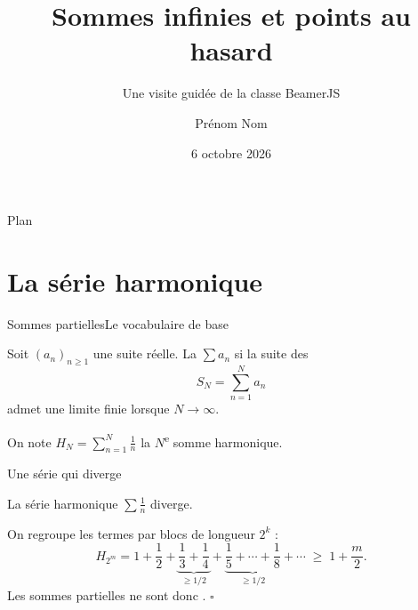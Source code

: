 \documentclass[nuit,charter,pied]{BeamerJS}
\title[Sommes infinies et points au hasard]{Sommes infinies et points au hasard}
\subtitle{Une visite guidée de la classe BeamerJS}
\author{Prénom Nom}
\institute{Université}
\date{6 octobre 2026}
\begin{document}
\begin{frame}
	\titlepage
\end{frame}

\begin{frame}{Plan}
	\tableofcontents
\end{frame}

\section{La série harmonique}

\begin{frame}{Sommes partielles}{Le vocabulaire de base}
	\begin{defn}[Série]
		Soit $(a_n)_{n\geq1}$ une suite réelle. La  $\sum a_n$
		 si la suite des 
		\[
			S_N=\sum_{n=1}^{N}a_n
		\]
		admet une limite finie lorsque $N\to\infty$.
	\end{defn}

	\begin{notation}
		On note $H_N=\sum_{n=1}^{N}\frac{1}{n}$ la $N$\textsuperscript{e}
		somme harmonique.
	\end{notation}
\end{frame}

\begin{frame}{Une série qui diverge}
	\begin{thm}
		La série harmonique $\sum\frac1n$ diverge.
	\end{thm}
	\pause
	\begin{preuve}
		On regroupe les termes par blocs de longueur $2^{k}$ :
		\[
			H_{2^{m}} = 1+\frac12
			+\underbrace{\frac13+\frac14}_{\geq 1/2}
			+\underbrace{\frac15+\cdots+\frac18}_{\geq 1/2}
			+\cdots
			\;\geq\; 1+\frac{m}{2}.
		\]
		Les sommes partielles ne sont donc .
		\hfill$\square$
	\end{preuve}
\end{frame}
\end{document}
